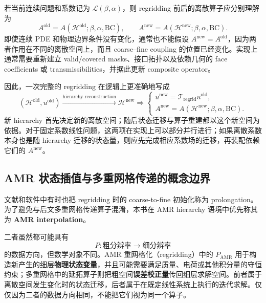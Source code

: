 若当前连续问题和系数记为 $\mathcal L(\beta,\alpha)$，则 regridding 前后的离散算子应分别理解为
\begin{equation}
A^{\mathrm{old}}
=A(\mathcal H^{\mathrm{old}};\beta,\alpha,\mathrm{BC}),
\qquad
A^{\mathrm{new}}
=A(\mathcal H^{\mathrm{new}};\beta,\alpha,\mathrm{BC}).
\label{eq:amr-regrid-operator-rebuild}
\end{equation}
即使连续 PDE 和物理边界条件没有变化，通常也不能假设 $A^{\mathrm{new}}=A^{\mathrm{old}}$，因为两者作用在不同的离散空间上，而且 coarse--fine coupling 的位置已经变化。实现上通常需要重新建立 valid/covered masks、接口拓扑以及依赖几何的 face coefficients 或 transmissibilities，并据此更新 composite operator。

因此，一次完整的 regridding 在逻辑上更准确地写成
\begin{equation}
\boxed{
(\mathcal H^{\mathrm{old}},u^{\mathrm{old}})
\xrightarrow{\text{hierarchy reconstruction}}
\mathcal H^{\mathrm{new}}
\Longrightarrow
\begin{cases}
u^{\mathrm{new}}=\mathcal T_{\mathrm{regrid}}u^{\mathrm{old}},\\[1mm]
A^{\mathrm{new}}=A(\mathcal H^{\mathrm{new}};\beta,\alpha,\mathrm{BC}).
\end{cases}
}
\label{eq:amr-regrid-full-chain}
\end{equation}
新 hierarchy 首先决定新的离散空间；随后状态迁移与算子重建都以这个新空间为依据。对于固定系数线性问题，这两项在实现上可以部分并行进行；如果离散系数本身也是随 hierarchy 迁移的状态量，则应先完成相应系数场的迁移，再装配依赖它们的 $A^{\mathrm{new}}$。

\subsection{AMR 状态插值与多重网格传递的概念边界}

文献和软件中有时也把 regridding 时的 coarse-to-fine 初始化称为 prolongation。为了避免与后文多重网格传递算子混淆，本书在 AMR hierarchy 语境中优先称其为 \textbf{AMR interpolation}。

二者虽然都可能具有
\begin{equation}
P:\text{粗分辨率}\longrightarrow\text{细分辨率}
\end{equation}
的数据方向，但数学对象不同。AMR 重网格化（regridding）中的 $P_{\mathrm{AMR}}$ 用于构造新产生的细层\textbf{物理状态变量}，并且可能需要满足质量、电荷或其他积分量的守恒约束；多重网格中的延拓算子则把粗空间\textbf{误差校正量}传回细层求解空间。前者属于离散空间发生变化时的状态迁移，后者属于在既定线性系统上执行的迭代求解。仅仅因为二者的数据方向相同，不能把它们视为同一个算子。

